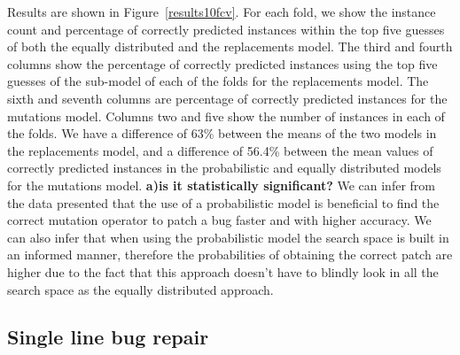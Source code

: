\documentclass[conference]{IEEEtran}
\newcommand{\todo}[1]
  {{\scriptsize \textbf{\color{red} {#1}}}}
\begin{document}
Results are shown in Figure~\ref{results10fcv}. For each fold, we show the instance count and percentage of correctly 
predicted instances within the top five
guesses of both the equally distributed and the replacements model. The
third and fourth columns show the percentage of correctly predicted
instances using the top five  
guesses of the sub-model of each of the folds for the replacements model. The sixth and seventh columns are percentage of correctly predicted instances for the mutations model. Columns two and five show
the number of instances in each of the folds. We have a difference of 63\% between the means of the two models in the replacements model, and a difference of 56.4\% between the mean values of correctly predicted instances in the probabilistic and equally distributed models for the mutations model. \todo{a)is it statistically significant?} We can infer from the data presented that the use of a probabilistic model is beneficial to find the correct mutation operator to patch a bug faster and with higher accuracy. We can also infer that when using the probabilistic model the search space is built in an informed manner, therefore the probabilities of obtaining the correct patch are higher due to the fact that this approach doesn't have to blindly look in all the search space as the equally distributed approach.


\subsection{Single line bug repair}
\label{sec:single}
\end{document}
